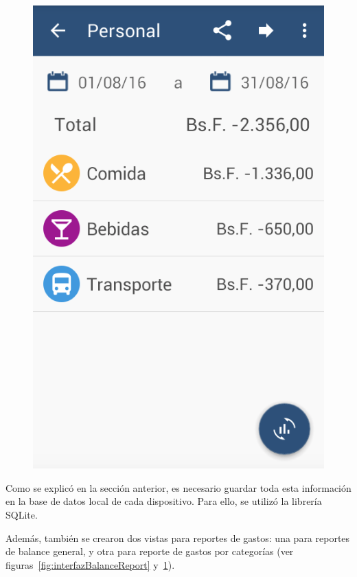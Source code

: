\begin{figure}[ht]
\begin{minipage}{.5\textwidth}
  \includegraphics[scale=0.4,type=png,ext=.png,read=.png]{imagenes/categories_report}
  \captionsetup{justification=centering}
  \label{fig:interfazCategoriesReport}
\end{minipage}
\end{figure}

Como se explicó en la sección anterior, es necesario guardar toda esta información en la base de datos local de cada dispositivo. Para ello, se utilizó la librería SQLite.

Además, también se crearon dos vistas para reportes de gastos: una para reportes de balance general, y otra para reporte de gastos por categorías (ver figuras~\ref{fig:interfazBalanceReport} y~\ref{fig:interfazCategoriesReport}).

